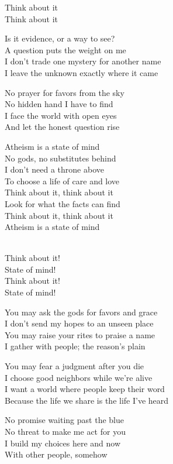 \begin{lyrics}
Think about it\\
Think about it

Is it evidence, or a way to see?\\
A question puts the weight on me\\
I don't trade one mystery for another name\\
I leave the unknown exactly where it came

No prayer for favors from the sky\\
No hidden hand I have to find\\
I face the world with open eyes\\
And let the honest question rise

Atheism is a state of mind\\
No gods, no substitutes behind\\
I don't need a throne above\\
To choose a life of care and love\\
Think about it, think about it\\
Look for what the facts can find\\
Think about it, think about it\\
Atheism is a state of mind

\\
Think about it!\\
State of mind!\\
Think about it!\\
State of mind!

You may ask the gods for favors and grace\\
I don't send my hopes to an unseen place\\
You may raise your rites to praise a name\\
I gather with people; the reason's plain

You may fear a judgment after you die\\
I choose good neighbors while we're alive\\
I want a world where people keep their word\\
Because the life we share is the life I've heard

No promise waiting past the blue\\
No threat to make me act for you\\
I build my choices here and now\\
With other people, somehow


\end{lyrics}
